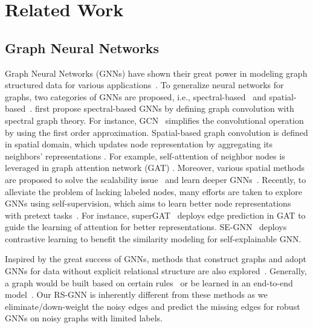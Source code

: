 \section{Related Work}
\label{sec:related_work}

\subsection{Graph Neural Networks}
Graph Neural Networks (GNNs) have shown their great power in modeling graph structured data for various applications~\cite{wang2019semi,wang2018cross,zhao2020semi,dai2021say,zhao2021graphsmote}.
To generalize neural networks for graphs, two categories of GNNs are proposed, i.e., spectral-based~\cite{bruna2013spectral,henaff2015deep,kipf2016semi,levie2018cayleynets} and spatial-based~\cite{velivckovic2017graph,hamilton2017inductive,chen2018fastgcn,chiang2019cluster}. \citeauthor{bruna2013spectral} \cite{bruna2013spectral} first propose spectral-based GNNs by defining graph convolution with spectral graph theory. For instance, GCN~\cite{kipf2016semi} simplifies the convolutional operation by using the first order approximation. Spatial-based graph convolution is defined in spatial domain, which updates node representation by aggregating its neighbors' representations \cite{niepert2016learning,gilmer2017neural,hamilton2017inductive}. 
For example, self-attention of neighbor nodes is leveraged in graph attention network (GAT) \cite{velivckovic2017graph}. Moreover, various spatial methods are proposed to solve the scalability issue~\cite{chen2018fastgcn,chiang2019cluster} and learn deeper GNNs~\cite{chen2020simple}.  Recently, to alleviate the problem of lacking labeled nodes, many efforts are taken to explore GNNs using self-supervision, which aims to learn better node representations with pretext tasks~\cite{sun2019multi,li2018deeper,kim2021find,zhu2020self,jin2020self,dai2021towards}. For instance, superGAT~\cite{kim2021find} deploys edge prediction in GAT to guide the learning of attention for better representations. SE-GNN~\cite{dai2021towards} deploys contrastive learning to benefit the similarity modeling for self-explainable GNN.

Inspired by the great success of GNNs, methods that construct graphs and adopt GNNs for data without explicit relational structure are also explored~\cite{henaff2015deep,chen2019multi,jiang2019semi,dai2021nrgnn}. Generally, a graph would be built based on certain rules~\cite{henaff2015deep,chen2019multi} or be learned in an end-to-end model~\cite{jiang2019semi,dai2021nrgnn}. Our RS-GNN is inherently different from these methods as we eliminate/down-weight the noisy edges and predict the missing edges for robust GNNs on noisy graphs with limited labels. 


